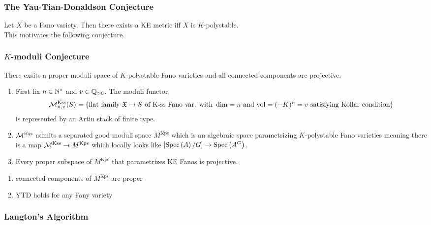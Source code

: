 \documentclass[12pt]{article}
\begin{document}
\subsubsection{The Yau-Tian-Donaldson Conjecture}
Let $X$ be a Fano variety. Then there exists a KE metric iff $X$ is $K$-polystable.
\bigskip\\
This motivates the following conjecture.

\subsubsection{$K$-moduli Conjecture}

There exsits a proper moduli space of $K$-polystable Fano varieties and all connected components are projective.

\begin{thm}
\begin{enumerate}
\item First fix $n \in \mathbb{N}^*$ and $v \in \mathbb{Q}_{>0}$. The moduli functor,
\[ \mathcal{M}^{\text{Kss}}_{n,v}(S) = \{ \text{flat family } \mathfrak{X} \to S \text{ of K-ss Fano var. with } \dim = n \text{ and } \mathrm{vol} = (-K)^n = v \text{ satisfying Kollar condition} \} \]
is represented by an Artin stack of finite type. 

\item $\mathcal{M}^{\text{Kss}}$ admits a separated good moduli space $M^{\text{Kps}}$ which is an algebraic space parametrizing $K$-polystable Fano varieties meaning there is a map $\mathcal{M}^{\text{Kss}} \to M^{\text{Kps}}$ which \etale locally looks like $[\mathrm{Spec}\left( A \right) / G] \to \mathrm{Spec}\left( A^G \right)$.
\item Every proper subspace of $M^{\text{Kps}}$ that parametrizes KE Fanos is projective.
\end{enumerate}
\end{thm}

\begin{thm}[Liu, Xu, -]
\begin{enumerate}
\item connected components of $M^{\text{Kps}}$ are proper
\item YTD holds for any Fany variety 
\end{enumerate}
\end{thm}

\subsubsection{Langton's Algorithm}
\end{document}
